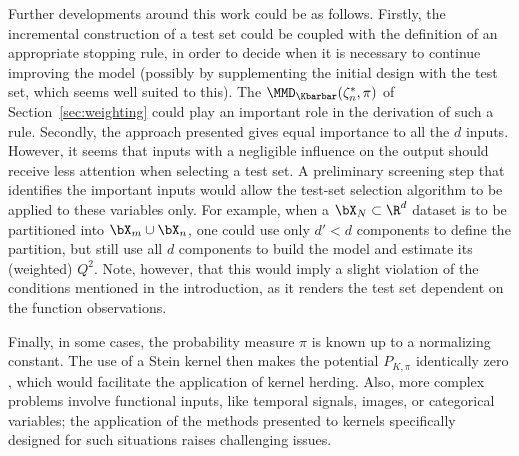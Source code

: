 Further developments around this work could be as follows. 
Firstly, the incremental construction of a test set could be coupled with the definition of an appropriate stopping rule, in order to decide when it is necessary to continue improving the model (possibly by supplementing the initial design with the test set, which seems well suited to this). 
The $\MMD_{\Kbarbar}(\zeta_n^*,\pi)$ of Section~\ref{sec:weighting} could play an important role in the derivation of such a rule. 
Secondly, the approach presented gives equal importance to all the $d$ inputs. 
However, it seems that inputs with a negligible influence on the output should receive less attention when selecting a test set. 
A preliminary screening step that identifies the important inputs would allow the test-set selection algorithm to be applied to these variables only. 
For example, when a $\bX_N\subset\R^d$ dataset is to be partitioned into $\bX_m\cup\bX_n$, one could use only $d'<d$ components to define the partition, but still use all $d$ components to build the model and estimate its (weighted) $Q^2$. 
Note, however, that this would imply a slight violation of the conditions mentioned in the introduction, as it renders the test set dependent on the function observations. 

Finally, in some cases, the probability measure $\pi$ is known up to a normalizing constant. 
The use of a Stein kernel then makes the potential $P_{K,\pi}$ identically zero \citep{chen_2018_stein_points}, which would facilitate the application of kernel herding. 
Also, more complex problems involve functional inputs, like temporal signals, images, or categorical variables; the application of the methods presented to kernels specifically designed for such situations raises challenging issues. 






